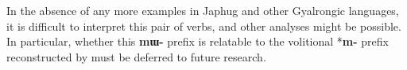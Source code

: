 \documentclass[oneside,a4paper,11pt]{article}
\newcommand{\ipa}[1]{\textbf{{\phon\mbox{#1}}}} %
\begin{document}

In the absence of any more examples in Japhug and other Gyalrongic languages, it is difficult to interpret this pair of verbs, and other analyses might be possible. In particular, whether this \ipa{mɯ-} prefix is relatable to the volitional *\ipa{m-} prefix reconstructed by \citet[55]{bs14oc} must be deferred to future research.



\end{document}
